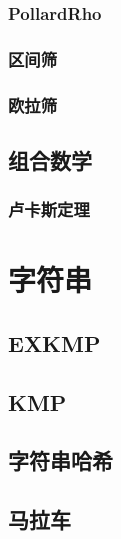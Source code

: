 \documentclass{article}
\begin{document}
\begin{multicols*}{3}
\subsubsection{PollardRho}


\subsubsection{区间筛}


\subsubsection{欧拉筛}


\subsection{组合数学}
\subsubsection{卢卡斯定理}


\section{字符串}
\subsection{EXKMP}


\subsection{KMP}


\subsection{字符串哈希}


\subsection{马拉车}



\end{multicols*}
\end{document}
